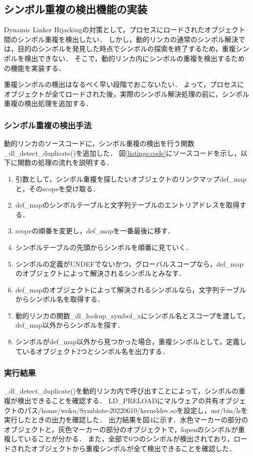 \documentclass[submit,techreq,noauthor]{eco}	%
\begin{document}
\subsection{シンボル重複の検出機能の実装}
Dynamic Linker Hijackingの対策として，プロセスにロードされたオブジェクト間のシンボル重複を検出したい．
しかし，動的リンカの通常のシンボル解決では，目的のシンボルを発見した時点でシンボルの探索を終了するため，重複シンボルを検出できない．
そこで，動的リンカ内にシンボルの重複を検出するための機能を実装する．

重複シンボルの検出はなるべく早い段階でおこないたい．
よって，プロセスにオブジェクトが全てロードされた後，実際のシンボル解決処理の前に，シンボル重複の検出処理を追加する．\\

\subsubsection{シンボル重複の検出手法}
動的リンカのソースコードに，シンボル重複の検出を行う関数 \_dl\_detect\_duplicate()を追加した．
図\ref{listings:code}にソースコードを示し，以下に関数の処理の流れを説明する．

\begin{enumerate}
  \item 引数として，シンボル重複を探したいオブジェクトのリンクマップdef\_mapと，そのscopeを受け取る．
  \item def\_mapのシンボルテーブルと文字列テーブルのエントリアドレスを取得する．
  \item scopeの順番を変更し，def\_mapを一番最後に移す．
  \item シンボルテーブルの先頭からシンボルを順番に見ていく．
  \item シンボルの定義がUNDEFでないかつ，グローバルスコープなら，def\_mapのオブジェクトによって解決されるシンボルとみなす．
  \item def\_mapのオブジェクトによって解決されるシンボルなら，文字列テーブルからシンボル名を取得する．
  \item 動的リンカの関数\_dl\_lookup\_symbol\_xにシンボル名とスコープを渡して，def\_map以外からシンボルを探す．
  \item シンボルがdef\_map以外から見つかった場合，重複シンボルとして，定義しているオブジェクト2つとシンボル名を出力する．\\
\end{enumerate}

\subsubsection{実行結果}
\_dl\_detect\_duplicate()を動的リンカ内で呼び出すことによって，シンボルの重複が検出できることを確認する．
LD\_PRELOADにマルウェアの共有オブジェクトのパス/home/woku/Symbiote-20220610/kerneldev.soを設定し，usr/bin/lsを実行したときの出力を確認した．
出力結果を図4に示す．水色マーカーの部分のオブジェクトと，灰色マーカーの部分のオブジェクトで，fopenのシンボルが重複していることが分かる．
また，全部で6つのシンボルが検出されており，ロードされたオブジェクトから重複シンボルが全て検出できることを確認した．\\
\end{document}
